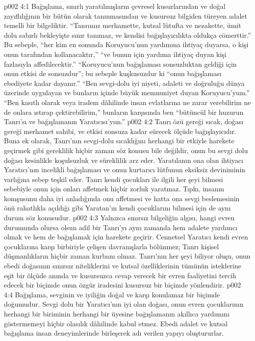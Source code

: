 \vs p002 4:1 Bağışlama, sınırlı yaratılmışların çevresel kusurlarından ve doğal zayıflılığının bir bütün olarak tanınmasından ve kusursuz bilgiden türeyen adalet temelli bir bilgeliktir. “Tanrımız merhamette, kutsal lütufta ve nezakette, ümit dolu sabırlı bekleyişte sınır tanımaz, ve kendisi bağışlayıcılıkta oldukça cömerttir.” Bu sebeple, “her kim en sonunda Koruyucu’nun yardımına ihtiyaç duyarsa, o kişi onun tarafından kollanacaktır,” “ve bunun için yardıma ihtiyaç duyan kişi fazlasıyla affedilecektir.” “Koruyucu’nun bağışlaması sonsuzluktan geldiği için onun etkisi de sonsuzdur”; bu sebeple kuşkusuzdur ki “onun bağışlaması ebediyete kadar dayanır.” “Ben sevgi\hyp{}dolu iyi niyeti, adaleti ve doğruluğu dünya üzerinde uygulayan ve bunların içinde büyük memnuniyet duyan Koruyucu’yum.” “Ben kasıtlı olarak veya iradem dâhilinde insan evlatlarına ne zarar verebilirim ne de onlara ıstırap çektirebilirim,” bunların karşısında ben “bütüncül bir huzurun Tanrı’sı ve bağışlamanın Yaratıcısı’yım.”
\vs p002 4:2 Tanrı özü gereği sıcak, doğası gereği merhamet sahibi, ve etkisi sonsuza kadar sürecek ölçüde bağışlayıcıdır. Buna ek olarak, Tanrı’nın sevgi\hyp{}dolu sıcaklığını herhangi bir etkiyle harekete geçirmek gibi gereklilik hiçbir zaman söz konusu bile değildir, onun bu sevgi dolu doğası kesinlikle koşulsuzluk ve süreklilik arz eder. Yaratılanın ona olan ihtiyacı Yaratıcı’nın incelikli bağışlaması ve onun kurtarıcı lütfunun eksiksiz deviniminin varlığına sebep teşkil eder. Tanrı kendi çocukları ile ilgili her şeyi bilmesi sebebiyle onun için onları affetmek hiçbir zorluk yaratmaz. Tıpkı, insanın komşusunu daha iyi anladığında onu affetmesi ve hatta ona sevgi beslemesinin önü rahatlıkla açıldığı gibi Yaratan’ın kendi çocuklarını bilmesi için de aynı durum söz konusudur.
\vs p002 4:3 Yalnızca sınırsız bilgeliğin algısı, hangi evren durumunda olursa olsun adil bir Tanrı’yı aynı zamanda hem adalete yardımcı olmak ve hem de bağışlamak için harekete geçirir. Cennetsel Yaratıcı kendi evren çocuklarına karşı birbiriyle çelişen davranışlarla bölünmez; Tanrı kişisel düşmanlıkların hiçbir zaman kurbanı olmaz. Tanrı’nın her şeyi biliyor oluşu, onun ebedi doğasının sınırsız niteliklerini ve kutsal özelliklerinin tümünün isteklerine eşit bir ölçüde anında ve kusursuzca cevap verecek bir evren faaliyetini tercih edecek bir biçimde onun özgür iradesini kusursuz bir biçimde yönlendirir.
\vs p002 4:4 Bağışlama, sevginin ve iyiliğin doğal ve karşı konulamaz bir biçimde doğumudur. Sevgi dolu bir Yaratıcı’nın iyi olan doğası, onun evren çocuklarının herhangi bir biriminin herhangi bir üyesine bağışlamanın akıllıca yardımını göstermemeyi hiçbir olasılık dâhilinde kabul etmez. Ebedi adalet ve kutsal bağışlama insan deneyimlerinde birleşerek  adı verilen yapıyı oluştururlar.
